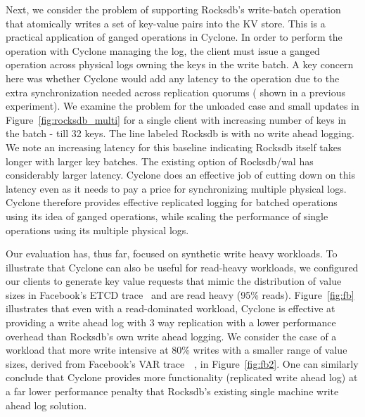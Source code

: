 \documentclass[pageno]{jpaper}
\begin{document}
Next, we consider the problem of supporting Rocksdb's write-batch operation that
atomically writes a set of key-value pairs into the KV store. This is a
practical application of ganged operations in Cyclone. In order to
perform the operation with Cyclone managing the log, the client must issue a
ganged operation across physical logs owning the keys in the write batch.
A key concern here was whether Cyclone would add any latency to the
operation due to the extra synchronization needed across replication quorums (
shown in a previous experiment).
We examine the problem for the unloaded case
and small updates in Figure~\ref{fig:rocksdb_multi} for a single client with
increasing number of keys in the batch - till 32 keys.
The line labeled Rocksdb is with no write ahead logging. We
note an increasing latency for this baseline indicating Rocksdb itself takes longer
with larger key batches. The existing option of Rocksdb/wal has considerably
larger latency. Cyclone does an effective job of cutting down on this latency
even as it needs to pay a price for synchronizing multiple physical
logs. Cyclone therefore provides effective replicated logging for batched
operations using its idea of ganged operations, while scaling the performance of
single operations using its multiple physical logs.


Our evaluation has, thus far, focused on synthetic write heavy workloads. To
illustrate that Cyclone can also be useful for read-heavy workloads, we
configured our clients to generate key value requests that mimic the
distribution of value sizes in Facebook's ETCD
trace~\cite{fb_workload_analysis,fb_scaling_memcache} and are read heavy (95\%
reads). Figure~\ref{fig:fb} illustrates that even with a read-dominated
workload, Cyclone is effective at providing a write ahead log with 3 way
replication with a lower performance overhead than Rocksdb's own write ahead
logging. We consider the case of a workload that more write intensive at 80\%
writes with a smaller range of value sizes, derived from Facebook's VAR
trace~~\cite{fb_workload_analysis,fb_scaling_memcache}, in
Figure~\ref{fig:fb2}. One can similarly conclude that Cyclone provides more
functionality (replicated write ahead log) at a far lower performance penalty
that Rocksdb's existing single machine write ahead log solution.
\end{document}
